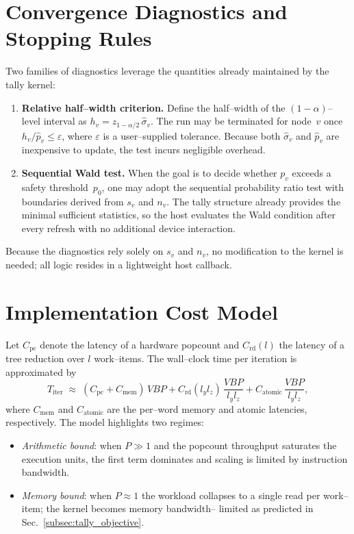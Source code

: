 \section{Convergence Diagnostics and Stopping Rules}
\label{subsec:tally_convergence}

Two families of diagnostics leverage the quantities already maintained by the
tally kernel:
\begin{enumerate}
  \item\textbf{Relative half--width criterion.}  Define the
        half--width of the \((1-\alpha)\)--level interval as
        \(h_v= z_{1-\alpha/2}\,\widehat{\sigma}_v\).  The run may be terminated
        for node~\(v\) once \(h_v/\widehat{p}_v\le \varepsilon\), where
        \(\varepsilon\) is a user--supplied tolerance.  Because both
        \(\widehat{\sigma}_v\) and \(\widehat{p}_v\) are inexpensive to update,
        the test incurs negligible overhead.
  \item\textbf{Sequential Wald test.}  When the goal is to decide whether
        \(p_v\) exceeds a safety threshold~\(p_0\), one may adopt the
        sequential probability ratio test with boundaries derived from
        \(s_v\) and \(n_v\).  The tally structure already provides the minimal
        sufficient statistics, so the host evaluates the Wald condition after
        every refresh with no additional device interaction.
\end{enumerate}
Because the diagnostics rely solely on \(s_v\) and \(n_v\), no modification to
the kernel is needed; all logic resides in a lightweight host callback.

\section{Implementation Cost Model}
\label{subsec:tally_cost_model}

Let \(C_{\mathrm{pc}}\) denote the latency of a hardware popcount and
\(C_{\mathrm{rd}}(l)\) the latency of a tree reduction over \(l\) work--items.
The wall--clock time per iteration is approximated by
\[
  T_{\text{iter}} \;\approx\;
  (C_{\mathrm{pc}} + C_{\mathrm{mem}})\,VBP +
  C_{\mathrm{rd}}(l_y l_z)\,\frac{VBP}{l_y l_z}
  + C_{\mathrm{atomic}}\,\frac{VBP}{l_y l_z},
\]
where \(C_{\mathrm{mem}}\) and \(C_{\mathrm{atomic}}\) are the per--word memory
and atomic latencies, respectively.  The model highlights two regimes:
\begin{itemize}
  \item\emph{Arithmetic bound}: when \(P\gg 1\) and the popcount throughput
        saturates the execution units, the first term dominates and scaling is
        limited by instruction bandwidth.
  \item\emph{Memory bound}: when \(P\approx 1\) the workload collapses to a
        single read per work--item; the kernel becomes memory bandwidth--
        limited as predicted in Sec.~\ref{subsec:tally_objective}.
\end{itemize}


